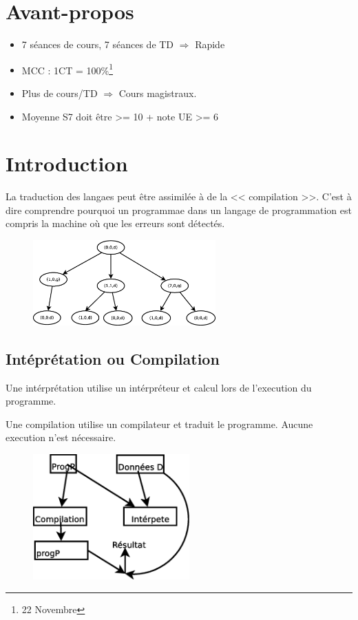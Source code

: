 \documentclass[12pt,a4paper,openany]{book}
\begin{document}
	\thispagestyle{empty} %
	\titleBC 
	\dominitoc
	\setcounter{tocdepth}{1}
	\setcounter{secnumdepth}{3}
	\setcounter{minitocdepth}{1}
	\chapter*{Avant-propos}
	\begin{attention}
		\begin{itemize}
			\item 7 séances de cours, 7 séances de TD $\Rightarrow$ Rapide
			\item MCC : 1CT = 100\%\footnote{22 Novembre}
			\item Plus de cours/TD $\Rightarrow$  Cours magistraux.
			\item Moyenne S7 doit être >= 10 + note UE >= 6
		\end{itemize}
	\end{attention}
	\tableofcontents
	\chapter{Introduction}
	La traduction des langaes peut être assimilée à de la << compilation >>.  C'est à dire comprendre pourquoi un programmae dans un langage de programmation est compris la machine où que les erreurs sont détectés.

	\begin{figure}[H]
		\centering
		\includegraphics[width=7cm]{Diagramme1.eps}
	\end{figure}

	\section{Intéprétation ou Compilation}
	Une intérprétation utilise un intérpréteur et calcul lors de l'execution du programme.

	Une compilation utilise un compilateur et traduit le programme. Aucune execution n'est nécessaire. 
	\begin{figure}[H]
		\centering
		\includegraphics[width=6cm]{Diagramme2.eps}
	\end{figure}
\end{document}
